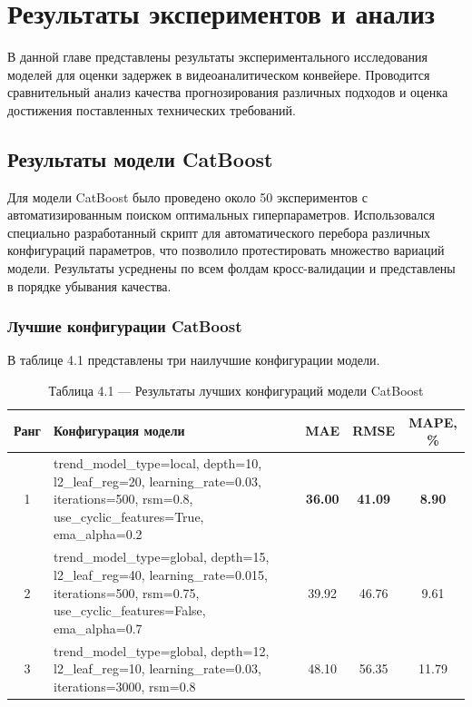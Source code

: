 \chapter{Результаты экспериментов и анализ}
\label{ch:results}

\hspace*{1.25cm}В данной главе представлены результаты экспериментального исследования моделей для оценки задержек в видеоаналитическом конвейере. Проводится сравнительный анализ качества прогнозирования различных подходов и оценка достижения поставленных технических требований.

\section{Результаты модели CatBoost}
\label{sec:catboost_results}

\hspace*{1.25cm}Для модели CatBoost было проведено около 50 экспериментов с автоматизированным поиском оптимальных гиперпараметров. Использовался специально разработанный скрипт для автоматического перебора различных конфигураций параметров, что позволило протестировать множество вариаций модели. Результаты усреднены по всем фолдам кросс-валидации и представлены в порядке убывания качества.

\subsection{Лучшие конфигурации CatBoost}

\hspace*{1.25cm}В таблице 4.1 представлены три наилучшие конфигурации модели.

\begin{table}[H]
	\centering
	\caption*{Таблица 4.1 --- Результаты лучших конфигураций модели CatBoost}
	\begin{tabular}{|c|p{8cm}|c|c|c|}
		\hline
		\textbf{Ранг} & \textbf{Конфигурация модели} & \textbf{MAE} & \textbf{RMSE} & \textbf{MAPE, \%} \\
		\hline
		1 & trend\_model\_type=local, depth=10, l2\_leaf\_reg=20, learning\_rate=0.03, iterations=500, rsm=0.8, use\_cyclic\_features=True, ema\_alpha=0.2 & \textbf{36.00} & \textbf{41.09} & \textbf{8.90} \\
		\hline
		2 & trend\_model\_type=global, depth=15, l2\_leaf\_reg=40, learning\_rate=0.015, iterations=500, rsm=0.75, use\_cyclic\_features=False, ema\_alpha=0.7 & 39.92 & 46.76 & 9.61 \\
		\hline
		3 & trend\_model\_type=global, depth=12, l2\_leaf\_reg=10, learning\_rate=0.03, iterations=3000, rsm=0.8 & 48.10 & 56.35 & 11.79 \\
		\hline
	\end{tabular}
	\label{tab:catboost_results}
\end{table}

